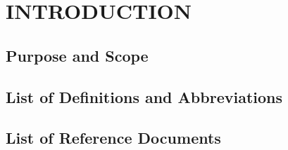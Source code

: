 \section{INTRODUCTION}
\subsection{Purpose and Scope}
\subsection{List of Definitions and Abbreviations}
\subsection{List of Reference Documents}

